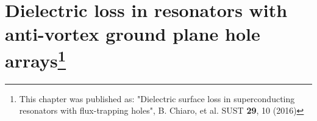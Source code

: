 \chapter[Vortex]{Dielectric loss in resonators with anti-vortex ground plane hole arrays\footnote{This chapter was published as: "Dielectric surface loss in superconducting resonators with flux-trapping holes",  B. Chiaro, et al. SUST \textbf{29}, 10 (2016)}}


%
\def \Bcapp {\text{B}^{\textrm{cool}}_{\textrm{applied}}}
\def \Qtlsparticipation {1/Q_{\text{TLS}} = \Sigma_{i}\, p_i \tan \delta_i}

